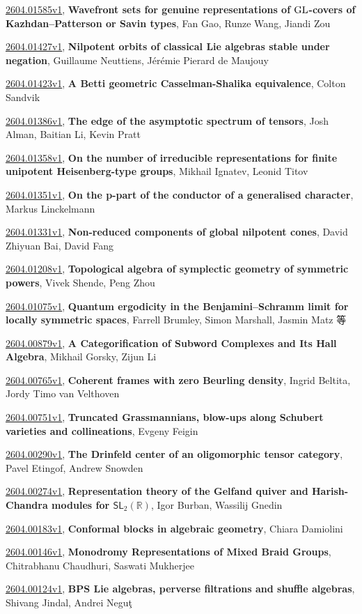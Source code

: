 \documentclass[9pt, a4paper]{article}
\theoremstyle{plain}
\theoremstyle{definition}
\theoremstyle{remark}
\newcommand{\arxiv}[3]{\href{https://arxiv.org/abs/#1}{#1}, \textbf{\textcolor{arxivblue}{#2}}, #3}
\begin{document}
\arxiv{2604.01585v1}{Wavefront sets for genuine representations of $\rm GL$-covers of Kazhdan--Patterson or Savin types}{Fan Gao, Runze Wang, Jiandi Zou}

\arxiv{2604.01427v1}{Nilpotent orbits of classical Lie algebras stable under negation}{Guillaume Neuttiens, Jérémie Pierard de Maujouy}

\arxiv{2604.01423v1}{A Betti geometric Casselman-Shalika equivalence}{Colton Sandvik}

\arxiv{2604.01386v1}{The edge of the asymptotic spectrum of tensors}{Josh Alman, Baitian Li, Kevin Pratt}

\arxiv{2604.01358v1}{On the number of irreducible representations for finite unipotent Heisenberg-type groups}{Mikhail Ignatev, Leonid Titov}

\arxiv{2604.01351v1}{On the p-part of the conductor of a generalised character}{Markus Linckelmann}

\arxiv{2604.01331v1}{Non-reduced components of global nilpotent cones}{David Zhiyuan Bai, David Fang}

\arxiv{2604.01208v1}{Topological algebra of symplectic geometry of symmetric powers}{Vivek Shende, Peng Zhou}

\arxiv{2604.01075v1}{Quantum ergodicity in the Benjamini--Schramm limit for locally symmetric spaces}{Farrell Brumley, Simon Marshall, Jasmin Matz 等}

\arxiv{2604.00879v1}{A Categorification of Subword Complexes and Its Hall Algebra}{Mikhail Gorsky, Zijun Li}

\arxiv{2604.00765v1}{Coherent frames with zero Beurling density}{Ingrid Beltita, Jordy Timo van Velthoven}

\arxiv{2604.00751v1}{Truncated Grassmannians, blow-ups along Schubert varieties and collineations}{Evgeny Feigin}

\arxiv{2604.00290v1}{The Drinfeld center of an oligomorphic tensor category}{Pavel Etingof, Andrew Snowden}

\arxiv{2604.00274v1}{Representation theory of the Gelfand quiver and Harish-Chandra modules for $\mathsf{SL}_2(\mathbb{R})$}{Igor Burban, Wassilij Gnedin}

\arxiv{2604.00183v1}{Conformal blocks in algebraic geometry}{Chiara Damiolini}

\arxiv{2604.00146v1}{Monodromy Representations of Mixed Braid Groups}{Chitrabhanu Chaudhuri, Saswati Mukherjee}

\arxiv{2604.00124v1}{BPS Lie algebras, perverse filtrations and shuffle algebras}{Shivang Jindal, Andrei Neguţ}
\end{document}
